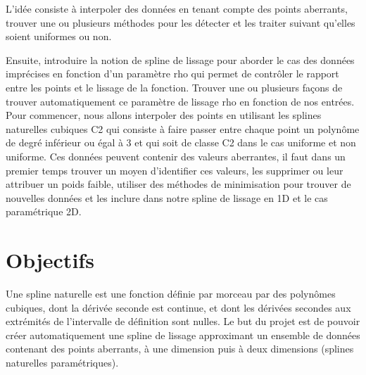 \documentclass[a4paper,12pt]{article}
\begin{document}
L’idée consiste à interpoler des données en tenant compte des points aberrants, trouver une ou plusieurs méthodes pour les détecter et les traiter suivant qu’elles soient uniformes ou non.

Ensuite, introduire la notion de spline de lissage pour aborder le cas des données imprécises en fonction d’un paramètre rho qui permet de contrôler le rapport entre les points et le lissage de la fonction. Trouver une ou plusieurs façons de trouver automatiquement ce paramètre de lissage rho en fonction de nos entrées.
Pour commencer, nous allons interpoler des points en utilisant les splines naturelles cubiques C2 qui consiste à faire passer entre chaque point un polynôme de degré inférieur ou égal à 3 et qui soit de classe C2 dans le cas uniforme et non uniforme.
Ces données peuvent contenir des valeurs aberrantes, il faut dans un premier temps trouver un moyen d’identifier ces valeurs, les supprimer ou leur attribuer un poids faible, utiliser des méthodes de minimisation pour trouver de nouvelles données et les inclure dans notre spline de lissage en 1D et le cas paramétrique 2D.

\section{Objectifs}


Une spline naturelle est une fonction définie par morceau par des polynômes cubiques, dont la dérivée seconde est continue, et dont les dérivées secondes aux extrémités de l'intervalle de définition sont nulles.
Le but du projet est de pouvoir créer automatiquement une spline de lissage approximant un ensemble de données contenant des points aberrants, à une dimension puis à deux dimensions (splines naturelles paramétriques).
\end{document}
